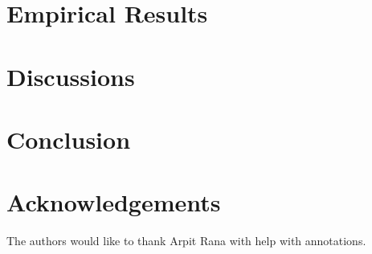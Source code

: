 \documentclass[a4paper,man,natbib]{apa6}
\begin{document}



\section{Empirical Results}

\section{Discussions}

\section{Conclusion}

\section{Acknowledgements}
The authors would like to thank Arpit Rana with help with annotations.
%
%
%






\end{document}
